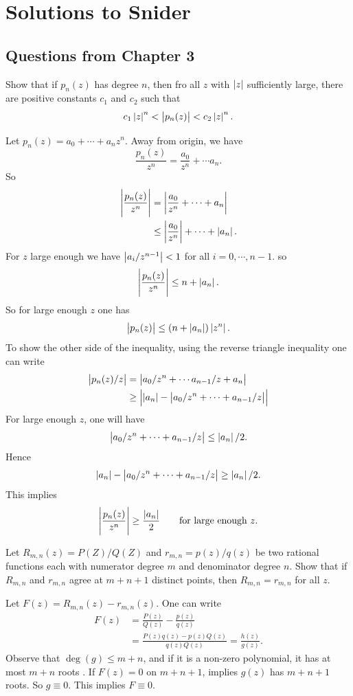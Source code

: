 \chapter{Solutions to Snider}


\section{Questions from Chapter 3}
\begin{problem}
	Show that if $ p_n(z) $ has degree $ n $, then fro all $ z $ with $ \left|z\right| $ sufficiently large, there are positive constants $ c_1 $ and $ c_2 $ such that
	\[ c_1\left|z\right|^n < \left|p_n(z)\right| < c_2 \left|z\right|^n. \]
\end{problem}

\begin{solution}
	Let $ p_n(z) = a_0 + \cdots + a_nz^n $. Away from origin, we have
	\[ \frac{p_n(z)}{z^n} = \frac{a_0}{z^n} + \cdots a_n. \]
	So
	\begin{align*}
		\left|\frac{p_n(z)}{z^n}\right| &= \left|\frac{a_0}{z^n} + \cdots + a_n\right| \\
		&\leq \left|\frac{a_0}{z^n}\right| + \cdots + \left|a_n\right|.
	\end{align*}
	For $ z $ large enough we have $ \left|a_i/z^{n-1}\right| < 1 $ for all $ i=0,\cdots,n-1 $. so
	\[ \left|\frac{p_n(z)}{z^n}\right| \leq n + \left|a_n\right|. \]
	So for large enough $ z $ one has
	\[ \left|p_n(z)\right| \leq (n+\left|a_n\right|)\left|z^n\right|. \]
	To show the other side of the inequality, using the reverse triangle inequality one can write
	\begin{align*}
		\left|p_n(z)/z\right| &= \left|a_0/z^{n}+\cdots a_{n-1}/z + a_n\right| \\
		&\geq \left| \left|a_n\right| - \left|a_0/z^{n}+\cdots+a_{n-1}/z\right|\right|
	\end{align*}
	For large enough $ z $, one will have
	\[ \left|a_0/z^n + \cdots + a_{n-1}/z\right| \leq \left|a_n\right|/2. \]
	Hence
	\[ \left|a_n\right| - \left|a_0/z^n + \cdots + a_{n-1}/z\right| \geq \left|a_n\right|/2. \]
	This implies
	\[ \left|\frac{p_n(z)}{z^n}\right| \geq \frac{\left|a_n\right|}{2} \qquad \text{for large enough $ z $}. \]
\end{solution}

\begin{problem}
	Let $ R_{m,n}(z) = P(Z)/Q(Z) $ and $ r_{m,n} = p(z)/q(z) $ be two rational functions each with numerator degree $ m $ and denominator degree $ n $. Show that if $ R_{m,n} $ and $ r_{m,n} $ agree at $ m+n+1 $ distinct points, then $ R_{m,n} = r_{m,n} $ for all $ z $.
\end{problem}
\begin{solution}
	Let $ F(z) = R_{m,n}(z) - r_{m,n}(z) $. One can write
	\begin{align*}
		F(z) &= \frac{P(z)}{Q(z)} - \frac{p(z)}{q(z)} \\
		&= \frac{P(z)q(z) - p(z)Q(z)}{q(z)Q(z)} = \frac{h(z)}{g(z)}.
	\end{align*}
	Observe that $ \deg(g) \leq m+n $, and if it is a non-zero polynomial, it has at most $ m+n $ roots . If $ F(z) = 0 $ on $ m+n+1 $, implies $ g(z) $ has $ m+n+1 $ roots. So $ g\equiv 0 $. This implies $ F \equiv 0 $. 
	
\end{solution}

